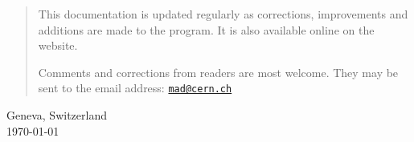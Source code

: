 \begin{titlepage}
\begin{quotation}
This documentation is updated regularly as corrections, improvements
and additions are made to the program. 
It is also available online on the \href{http://cern.ch/madx}{\madx} website.

Comments and corrections from readers are most welcome.
They may be sent to the email address:
\href{mailto:mad@cern.ch?subject=[user's guide]}{\texttt{mad@cern.ch}}
\end{quotation}
\vfill

\begin{center}
Geneva, Switzerland \\
\today
\end{center}

\end{titlepage}
